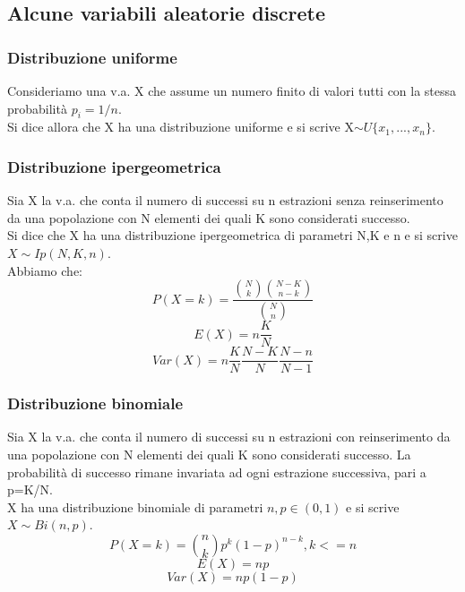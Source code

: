 \documentclass{article}
\begin{document}
\subsection{Alcune variabili aleatorie discrete}
\subsubsection{Distribuzione uniforme}
Consideriamo una v.a. X che assume un numero finito di valori tutti con la stessa probabilità $p_i=1/n$.\\
Si dice allora che X ha una distribuzione uniforme e si scrive X$\sim U\{x_1,...,x_n\}$.
\subsubsection{Distribuzione ipergeometrica}
Sia X la v.a. che conta il numero di successi su n estrazioni senza reinserimento da una popolazione con N elementi dei quali K sono considerati successo.\\
Si dice che X ha una distribuzione ipergeometrica di parametri N,K e n e si scrive $X\sim Ip(N,K,n)$.\\
Abbiamo che:
\begin{equation}
P(X=k)=\frac{{{N}\choose{k}}{{N-K}\choose{n-k}}}{{{N}\choose{n}}}
\end{equation}
\begin{equation}
E(X)=n\frac{K}{N}
\end{equation}
\begin{equation}
Var(X)=n{\frac{K}{N}}{\frac{N-K}{N}}{\frac{N-n}{N-1}}
\end{equation}
\subsubsection{Distribuzione binomiale}
Sia X la v.a. che conta il numero di successi su n estrazioni con reinserimento da una popolazione con N elementi dei quali K sono considerati successo. La probabilità di successo rimane invariata ad ogni estrazione successiva, pari a p=K/N.\\
X ha una distribuzione binomiale di parametri $n,p \in{(0,1)}$ e si scrive $X\sim Bi(n,p)$.
\begin{equation}
P(X=k)={{n}\choose{k}}p^k(1-p)^{n-k}, k<=n
\end{equation}
\begin{equation}
E(X)=np
\end{equation}
\begin{equation}
Var(X)=np(1-p)
\end{equation}
\end{document}
